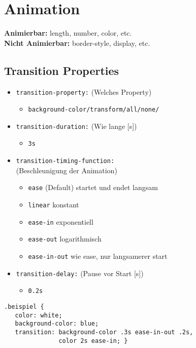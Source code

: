 
\section{Animation}

\textbf{Animierbar:} length, number, color, etc.\\
\textbf{Nicht Animierbar:} border-style, display, etc.

\subsection{Transition Properties}


\begin{itemize}
    \item \texttt{transition-property:} (Welches Property)
    \begin{itemize}
        \item \texttt{background-color/transform/all/none/}
    \end{itemize}
    \item \texttt{transition-duration:} (Wie lange [s])
    \begin{itemize}
        \item \texttt{3s}
    \end{itemize}
    \item \texttt{transition-timing-function:}\\
    (Beschleunigung der Animation)
    \begin{itemize}
        \item \texttt{ease} (Default) startet und endet langsam
        \item \texttt{linear} konstant
        \item \texttt{ease-in} exponentiell
        \item \texttt{ease-out} logarithmisch
        \item \texttt{ease-in-out} wie ease, nur langsamerer start
    \end{itemize}
    \item \texttt{transition-delay:} (Pause vor Start [s])
    \begin{itemize}
        \item \texttt{0.2s}
    \end{itemize}
\end{itemize}
\begin{lstlisting}
.beispiel {
   color: white;
   background-color: blue;
   transition: background-color .3s ease-in-out .2s,
               color 2s ease-in; }
\end{lstlisting}

